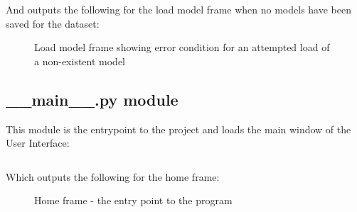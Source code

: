\documentclass[./project-report/src/latex/project-report.tex]{subfiles}
\begin{document}
\begin{itemize}
        And outputs the following for the load model frame when no models have been saved for the dataset:

        \begin{figure}[h!]
        \centering
        \caption{Load model frame showing error condition for an attempted load of a non-existent model}
        \label{fig:load-model-frame-impl-error}
        \end{figure}
\end{itemize}

\subsection{\_\_main\_\_.py module}

This module is the entrypoint to the project and loads the main window of the User Interface:

\label{sec:__main__-module}
\inputminted{python}{./school_project/__main__.py}

Which outputs the following for the home frame:

\begin{figure}[h!]
\centering
{}
\caption{Home frame - the entry point to the program}
\label{fig:home-frame-impl}
\end{figure}
\end{document}
